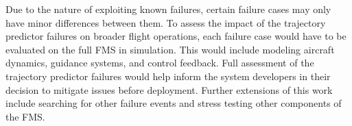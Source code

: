 



Due to the nature of exploiting known failures, certain failure cases may only have minor differences between them.
To assess the impact of the trajectory predictor failures on broader flight operations, each failure case would have to be evaluated on the full FMS in simulation.
This would include modeling aircraft dynamics, guidance systems, and control feedback. 
Full assessment of the trajectory predictor failures would help inform the system developers in their decision to mitigate issues before deployment.
Further extensions of this work include searching for other failure events and stress testing other components of the FMS.


\pagebreak


